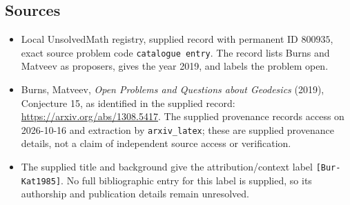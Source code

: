\documentclass[11pt]{article}
\begin{document}
\subsection{Sources}
\begin{itemize}
\item Local UnsolvedMath registry, supplied record with permanent ID \(800935\), exact source problem code \texttt{catalogue entry}. The record lists Burns and Matveev as proposers, gives the year 2019, and labels the problem open.
\item Burns, Matveev, \emph{Open Problems and Questions about Geodesics} (2019), Conjecture 15, as identified in the supplied record: \url{https://arxiv.org/abs/1308.5417}. The supplied provenance records access on 2026-10-16 and extraction by \texttt{arxiv\_latex}; these are supplied provenance details, not a claim of independent source access or verification.
\item The supplied title and background give the attribution/context label \texttt{[Bur-Kat1985]}. No full bibliographic entry for this label is supplied, so its authorship and publication details remain unresolved.
\end{itemize}
\end{document}
